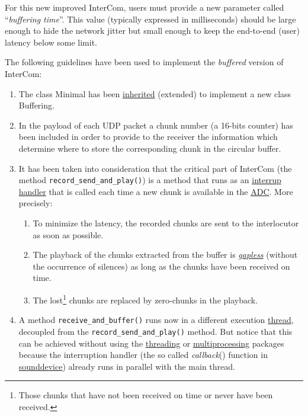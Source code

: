 For this new improved InterCom, users must provide a new parameter
called ``\emph{buffering time}''. This value (typically expressed in
milliseconds) should be large enough to hide the network jitter but
small enough to keep the end-to-end (user) latency below some limit.

The following guidelines have been used to implement the
\emph{buffered} version of InterCom:

\begin{enumerate}
\item The class Minimal has been
  \href{https://en.wikipedia.org/wiki/Inheritance_(object-oriented_programming)}{inherited}
  (extended) to implement a new class Buffering.
\item In the payload of each UDP packet a chunk number (a 16-bits
  counter) has been included in order to provide to the receiver the
  information which determine where to store the corresponding chunk in
  the circular buffer.
\item It has been taken into consideration that the critical part of
  InterCom (the method \verb|record_send_and_play()|) is a method that
  runs as an
  \href{https://en.wikipedia.org/wiki/Interrupt_handler}{interrup
    handler} that is called each time a new chunk is available in the
  \href{https://en.wikipedia.org/wiki/Analog-to-digital_converter}{ADC}. More
  precisely:
  \begin{enumerate}
  \item To minimize the latency, the recorded chunks are sent
    to the interlocutor as soon as possible.
  \item The playback of the chunks extracted from the buffer is
    \href{https://en.wikipedia.org/wiki/Gapless_playback}{\emph{gapless}}
    (without the occurrence of silences) as long as the chunks have
    been received on time.
  \item The lost\footnote{Those chunks that have not been
  received on time or never have been received.} chunks are replaced
    by zero-chunks in the playback.
  \end{enumerate}
\item A method \verb|receive_and_buffer()| runs now in a different
  execution
  \href{https://en.wikipedia.org/wiki/Thread_(computing)}{thread},
  decoupled from the \verb|record_send_and_play()| method. But notice
  that this can be achieved without using the
  \href{https://docs.python.org/3/library/threading.html}{threading}
  or
  \href{https://docs.python.org/3/library/multiprocessing.html}{multiprocessing}
  packages because the interruption handler (the so called
  \emph{callback}() function in
  \href{https://python-sounddevice.readthedocs.io/en/0.3.14/api.html}{sounddevice})
  already runs in parallel with the main thread.
\end{enumerate}

